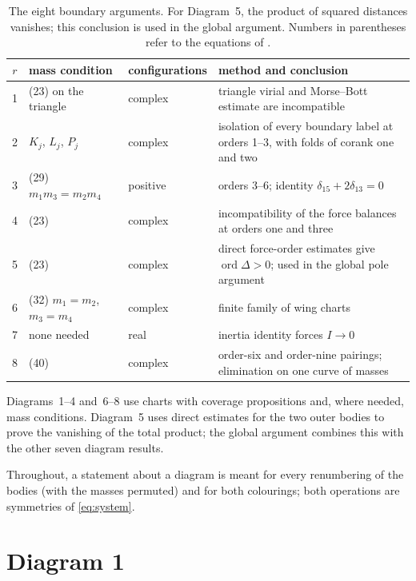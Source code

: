 \documentclass[11pt]{amsart}
\theoremstyle{definition}
\theoremstyle{remark}
\newcommand{\ord}{\operatorname{ord}}
\begin{document}
{\begin{table}[ht]
\centering
\small
\begin{tabular}{cllp{5.4cm}}
\hline
$r$ & mass condition & configurations & method and conclusion \\
\hline
1 & (23) on the triangle & complex & triangle virial and Morse--Bott estimate are incompatible \\
2 & $K_j$, $L_j$, $P_j$ & complex & isolation of every boundary label at orders 1--3,
with folds of corank one and two \\
3 & (29) $m_1m_3=m_2m_4$ & positive & orders 3--6; identity $\delta_{15}+2\delta_{13}=0$ \\
4 & (23) & complex & incompatibility of the force balances at orders one and three \\
5 & (23) & complex & direct force-order estimates give $\ord\Delta>0$; used in the global pole argument \\
6 & (32) $m_1=m_2$, $m_3=m_4$ & complex & finite family of wing charts \\
7 & none needed & real & inertia identity forces $I\to0$ \\
8 & (40) & complex & order-six and order-nine pairings; elimination on one curve of masses \\
\hline
\end{tabular}
\caption{The eight boundary arguments.  For Diagram~5, the product of squared distances vanishes;
this conclusion is used in the global argument.  Numbers in parentheses refer to the equations of \cite[\S8]{AK}.}
\label{tab:exclusions}
\end{table}

Diagrams~1--4 and~6--8 use charts with coverage propositions and, where needed, mass conditions.
Diagram~5 uses direct estimates for the two outer bodies to prove the vanishing of the total
product; the global argument combines this with the other seven diagram results.
}
Throughout, a statement about a diagram is meant for every renumbering of the bodies (with the
masses permuted) and for both colourings; both operations are symmetries of
\eqref{eq:system}.


\section{Diagram 1}\label{sec:d1}
\end{document}
